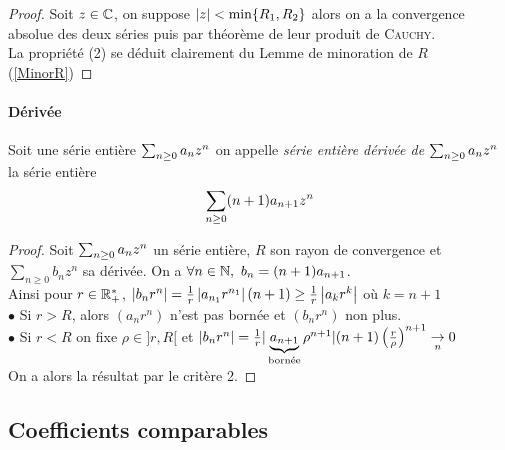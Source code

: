 		\begin{proof}
		Soit $z\in{\mathbb{C}}$, on suppose $\left\vert z \right\vert <\min \{R_1,R_2\}$ alors on a la convergence absolue des deux séries puis par théorème de leur produit de \textsc{Cauchy}. \\
		La propriété (2) se déduit clairement du Lemme de minoration de $R$ (\ref{MinorR})
		\end{proof} \medskip
		
		\traitd
		\paragraph{Dérivée}
			Soit une série entière $\sum_{n\geq 0} a_nz^n$ on appelle \emph{série entière dérivée de $\sum_{n\geq 0} a_nz^n$} la série entière 
			\[ 
				\sum_{n\geq 0} (n+1)a_{n+1}z^n 
			\vspace{-15pt}
			\] 
		\trait
		
		
		\begin{proof}
		Soit $\sum_{n\geq 0} a_nz^n$ un série entière, $R$ son rayon de convergence et $\sum_{n\geq 0} b_nz^n$ sa dérivée. On a $\forall n\in{\mathbb{N}} ,~ b_n=(n+1)a_{n+1}$. \\
		Ainsi pour $r\in{\mathbb{R}}_+^*$, $\left\vert b_nr^n \right\vert = \frac{1}{r} \left\vert a_{n_1} r^{n_1}  \right\vert(n+1) \geq \frac{1}{r} \left\vert a_kr^k \right\vert$ où $k=n+1$ \\
		$\bullet$ Si $r>R$, alors $(a_nr^n)$ n'est pas bornée et $(b_nr^n)$ non plus.\\
		$\bullet$ Si $r<R$ on fixe $\rho \in ]r,R[$ et $\left\vert b_nr^n \right\vert = \frac{1}{r}\vert\underbrace{a_{n+1}}_{\text{bornée}}\rho^{n+1}\vert(n+1)\left( \frac{r}{\rho}\right)^{n+1} \underset{n}{\rightarrow} 0$\\
		On a alors la résultat par le critère 2.
		\end{proof} \medskip
		
		 \medskip
		
		
	\subsection{Coefficients comparables}
		
		 \medskip
		
